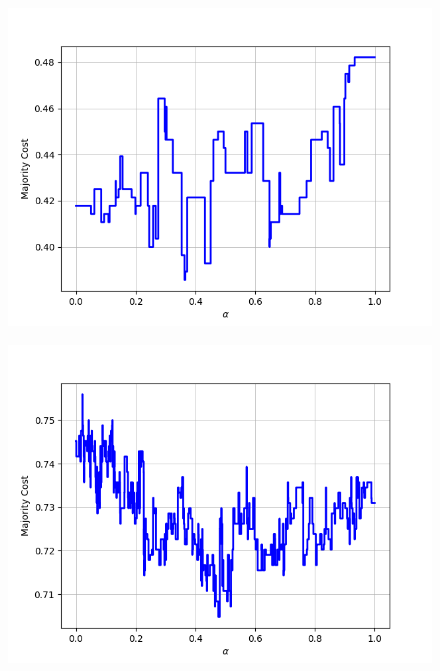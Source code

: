 \begin{figure}[h]
\begin{minipage}{.19\textwidth}
  {\includegraphics[width=\linewidth]{plots/omniglot-intra-ac-cnn/N_Ko}}
\end{minipage}
\begin{minipage}{.19\textwidth}
  \centering
  {\includegraphics[width=\linewidth]{plots/omniglot-intra-ac-cnn/Ojibwe_(Canadian_Aboriginal_Syllabics)}}
\end{minipage}
\begin{minipage}{.19\textwidth}
  \centering

\end{minipage}
\end{figure}
